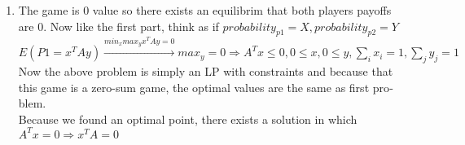 \begin{enumerate}
\begin{latin}
            \end{latin}
            \item \phantom{text}
            \begin{latin}
                  The game is 0 value so there exists an equilibrim that both players payoffs are 0.
                  Now like the first part, think as if $probability_{p1} = X,probability_{p2} = Y$ \\ 
                  $E(P1 = x^TAy) \xrightarrow{min_xmax_yx^TAy=0} max_y = 0 \Rightarrow A^Tx \leq 0 ,0 \leq x, 0 \leq y , \sum_i{x_i} = 1,\sum_j{y_j} = 1$\\
                  Now the above problem is simply an LP with constraints and because that this game is a zero-sum game, the optimal values are the same as first problem.\\
                  Because we found an optimal point, there exists a solution in which $A^Tx=0 \Rightarrow x^TA = 0 $

            \end{latin}
          
        \end{enumerate}
